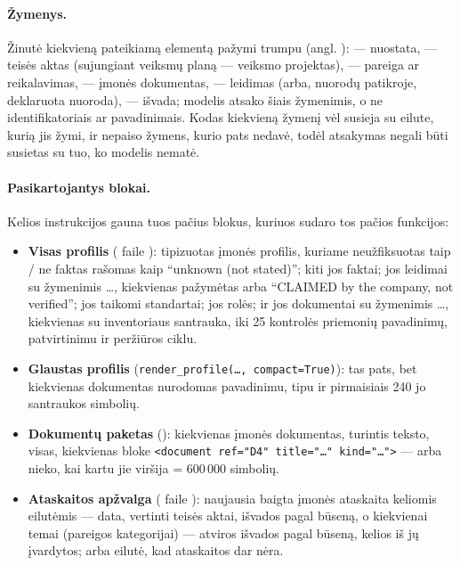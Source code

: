 \paragraph{Žymenys.} Žinutė kiekvieną pateikiamą elementą pažymi trumpu  (angl.
):  --- nuostata,  --- teisės aktas (sujungiant veiksmų planą ---
veiksmo projektas),  --- pareiga ar reikalavimas,  --- įmonės dokumentas,
 --- leidimas (arba, nuorodų patikroje, deklaruota nuoroda),  --- išvada; modelis
atsako šiais žymenimis, o ne identifikatoriais ar pavadinimais. Kodas kiekvieną žymenį vėl susieja
su eilute, kurią jis žymi, ir nepaiso žymens, kurio pats nedavė, todėl atsakymas negali
būti susietas su tuo, ko modelis nematė.

\paragraph{Pasikartojantys blokai.} Kelios instrukcijos gauna tuos pačius blokus, kuriuos sudaro
tos pačios funkcijos:
\begin{itemize}[itemsep=1pt, topsep=3pt]
  \item \textbf{Visas profilis} ( faile ):
    tipizuotas įmonės profilis, kuriame neužfiksuotas taip / ne faktas rašomas kaip
    \enquote{unknown (not stated)}; kiti jos faktai; jos leidimai su žymenimis …,
    kiekvienas pažymėtas  arba \enquote{CLAIMED by the company, not verified};
    jos taikomi standartai; jos rolės; ir jos dokumentai su žymenimis …, kiekvienas su
    inventoriaus santrauka, iki 25 kontrolės priemonių pavadinimų, patvirtinimu ir peržiūros
    ciklu.
  \item \textbf{Glaustas profilis} (\texttt{render\_profile(…, compact=True)}): tas pats, bet
    kiekvienas dokumentas nurodomas pavadinimu, tipu ir pirmaisiais 240 jo santraukos simbolių.
  \item \textbf{Dokumentų paketas} (): kiekvienas įmonės dokumentas, turintis
    teksto, visas, kiekvienas bloke \texttt{<document ref="D4" title="…" kind="…">} --- arba
    nieko, kai kartu jie viršija  = 600\,000 simbolių.
  \item \textbf{Ataskaitos apžvalga} ( faile ):
    naujausia baigta įmonės ataskaita keliomis eilutėmis --- data, vertinti teisės aktai,
    išvados pagal būseną, o kiekvienai temai (pareigos kategorijai) --- atviros išvados pagal
    būseną, kelios iš jų įvardytos; arba eilutė, kad ataskaitos dar nėra.
\end{itemize}

